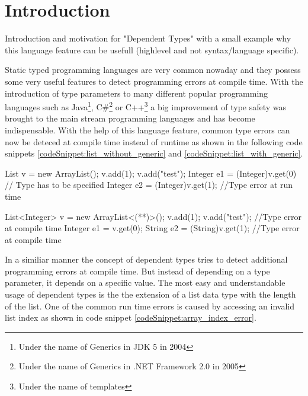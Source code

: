 \section{Introduction}
Introduction and motivation for "Dependent Types" with a small example why this language feature can be usefull (highlevel and not syntax/language specific).

Static typed programming languages are very common nowaday and they possess some very useful features to detect programming errors at compile time.
With the introduction of type parameters to many different popular programming languages such as Java\footnote{Under the name of Generics in JDK 5 in 2004\cite{JDK5}},
 C\#\footnote{Under the name of Generics in .NET Framework 2.0 in 2005\cite{dotnet20}} or C++\footnote{Under the name of templates} a big improvement of type safety was brought to the main stream programming languages and has become indispensable.
With the help of this language feature, common type errors can now be deteced at compile time instead of runtime as shown in the following code snippets \ref{codeSnippet:list_without_generic} and \ref{codeSnippet:list_with_generic}.
\begin{adjustbox}{width=\columnwidth}
\begin{codesnippet}[caption={List without generic argument}, label={codeSnippet:list_without_generic}]
List v = new ArrayList();
v.add(1);
v.add("test");
Integer e1 = (Integer)v.get(0) // Type has to be specified
Integer e2 = (Integer)v.get(1); //Type error at run time
\end{codesnippet}
\end{adjustbox}
\begin{adjustbox}{width=\columnwidth}
\begin{codesnippet}[escapeinside={(*}{*)}, caption={List with type argument}, label={codeSnippet:list_with_generic}]
List<Integer> v = new ArrayList<(**)>();
v.add(1);
v.add("test"); //Type error at compile time
Integer e1 = v.get(0);
String e2 = (String)v.get(1); //Type error at compile time
\end{codesnippet}
\end{adjustbox}

In a similiar manner the concept of dependent types tries to detect additional programming errors at compile time. But instead of depending on a type parameter, it depends on a specific value. 
The most easy and understandable usage of dependent types is the the extension of a list data type with the length of the list. 
One of the common run time errors is caused by accessing an invalid list index as shown in code snippet \ref{codeSnippet:array_index_error}.

